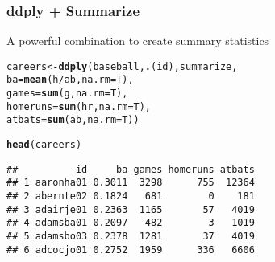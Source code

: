 \documentclass{beamer}\usepackage[]{graphicx}\usepackage[]{color}
\makeatletter
\newcommand{\hlopt}[1]{\textcolor[rgb]{0,0,0}{#1}}%
\newcommand{\hlstd}[1]{\textcolor[rgb]{0.345,0.345,0.345}{#1}}%
\newcommand{\hlkwb}[1]{\textcolor[rgb]{0.69,0.353,0.396}{#1}}%
\newcommand{\hlkwc}[1]{\textcolor[rgb]{0.333,0.667,0.333}{#1}}%
\newcommand{\hlkwd}[1]{\textcolor[rgb]{0.737,0.353,0.396}{\textbf{#1}}}%
\newenvironment{kframe}{%
 \def\at@end@of@kframe{}%
 \ifinner\ifhmode%
  \def\at@end@of@kframe{\end{minipage}}%
  \begin{minipage}{\columnwidth}%
 \fi\fi%
 \def\FrameCommand##1{\hskip\@totalleftmargin \hskip-\fboxsep
 \colorbox{shadecolor}{##1}\hskip-\fboxsep
     \hskip-\linewidth \hskip-\@totalleftmargin \hskip\columnwidth}%
 \MakeFramed {\advance\hsize-\width
   \@totalleftmargin\z@ \linewidth\hsize
   \@setminipage}}%
 {\par\unskip\endMakeFramed%
 \at@end@of@kframe}
\newenvironment{knitrout}{}{} %
\makeatother
\begin{document}
\begin{frame}[fragile]
\frametitle{ddply + Summarize}
{\large A powerful combination to create summary statistics}
\begin{knitrout}\scriptsize
{}\color{fgcolor}\begin{kframe}
\begin{alltt}
\hlstd{careers} \hlkwb{<-} \hlkwd{ddply}\hlstd{(baseball,} \hlkwd{.}\hlstd{(id), summarize,}
                 \hlkwc{ba} \hlstd{=} \hlkwd{mean}\hlstd{(h}\hlopt{/}\hlstd{ab,} \hlkwc{na.rm}\hlstd{=T),}
                 \hlkwc{games} \hlstd{=} \hlkwd{sum}\hlstd{(g,} \hlkwc{na.rm}\hlstd{=T),}
                 \hlkwc{homeruns} \hlstd{=} \hlkwd{sum}\hlstd{(hr,} \hlkwc{na.rm}\hlstd{=T),}
                 \hlkwc{atbats} \hlstd{=} \hlkwd{sum}\hlstd{(ab,} \hlkwc{na.rm}\hlstd{=T))}

\hlkwd{head}\hlstd{(careers)}
\end{alltt}
\begin{verbatim}
##          id     ba games homeruns atbats
## 1 aaronha01 0.3011  3298      755  12364
## 2 abernte02 0.1824   681        0    181
## 3 adairje01 0.2363  1165       57   4019
## 4 adamsba01 0.2097   482        3   1019
## 5 adamsbo03 0.2378  1281       37   4019
## 6 adcocjo01 0.2752  1959      336   6606
\end{verbatim}
\end{kframe}
\end{knitrout}
\end{frame}
\end{document}

